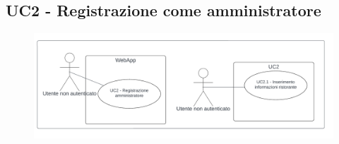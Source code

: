 \subsection{UC2 - Registrazione come amministratore}\label{usecase:2}

\begin{figure}[H]
    \centering
    \includegraphics[width=0.9\linewidth]{ucd/UCD2_corretto.png}
\end{figure}

